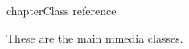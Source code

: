 chapter{Class reference}\label{classref}
%
\setfooter{\thepage}{}{}{}{}{\thepage}

These are the main mmedia classes.








